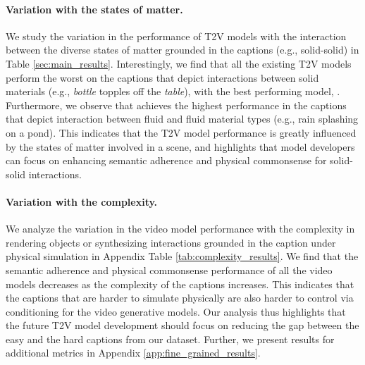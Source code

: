\paragraph{Variation with the states of matter.} We study the variation in the performance of T2V models with the interaction between the diverse states of matter grounded in the captions (e.g., solid-solid) in Table \ref{sec:main_results}. Interestingly, we find that all the existing T2V models perform the worst on the captions that depict interactions between solid materials (e.g., \textit{bottle} topples off the \textit{table}), with the best performing model, . Furthermore, we observe that  achieves the highest performance in the captions that depict interaction between fluid and fluid material types (e.g., rain splashing on a pond). This indicates that the T2V model performance is greatly influenced by the states of matter involved in a scene, and highlights that model developers can focus on enhancing semantic adherence and physical commonsense for solid-solid interactions. 


\paragraph{Variation with the complexity.} We analyze the variation in the video model performance with the complexity in rendering objects or synthesizing interactions grounded in the caption under physical simulation in Appendix Table \ref{tab:complexity_results}. We find that the semantic adherence and physical commonsense performance of all the video models decreases as the complexity of the captions increases. This indicates that the captions that are harder to simulate physically are also harder to control via conditioning for the video generative models. Our analysis thus highlights that the future T2V model development should focus on reducing the gap between the easy and the hard captions from our \name{} dataset.  Further, we present results for additional metrics in Appendix \ref{app:fine_grained_results}.

